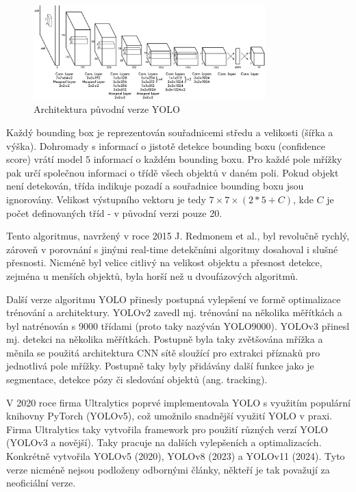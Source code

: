 \begin{figure}[]
    \centering
    \includegraphics[width=0.8\textwidth]{Figures/yolo}
    \caption{Architektura původní verze YOLO \cite{yolo}}
    \label{fig:yolo}
\end{figure}

Každý bounding box je reprezentován souřadnicemi středu a velikosti (šířka a
výška). Dohromady s informací o jistotě detekce bounding boxu (confidence
score) vrátí model $5$ informací o každém bounding boxu. Pro každé pole mřížky
pak určí společnou informaci o třídě všech objektů v daném poli. Pokud objekt
není detekován, třída indikuje pozadí a souřadnice bounding boxu jsou
ignorovány. Velikost výstupního vektoru je tedy $7 \times 7 \times (2 * 5 +
    C)$, kde $C$ je počet definovaných tříd - v původní verzi pouze 20.

Tento algoritmus, navržený v roce 2015 J. Redmonem et al., byl revolučně
rychlý, zároveň v porovnání s jinými real-time detekčními algoritmy dosahoval i
slušné přesnosti. Nicméně byl velice citlivý na velikost objektu a přesnost
detekce, zejména u menších objektů, byla horší než u dvoufázových algoritmů.

Další verze algoritmu YOLO přinesly postupná vylepšení ve formě optimalizace
trénování a architektury. YOLOv2 \cite{yolo9000} zavedl mj. trénování na
několika měřítkách a byl natrénován s 9000 třídami (proto taky nazýván
YOLO9000). YOLOv3 \cite{yolov3} přinesl mj. detekci na několika měřítkách.
Postupně byla taky zvětšována mřížka a měnila se použitá architektura CNN sítě
sloužící pro extrakci příznaků pro jednotlivá pole mřížky. Postupně taky byly
přidávány další funkce jako je segmentace, detekce pózy či sledování objektů
(ang. tracking).

V 2020 roce firma Ultralytics poprvé implementovala YOLO s využitím populární
knihovny PyTorch (YOLOv5), což umožnilo snadnější využití YOLO v praxi. Firma
Ultralytics taky vytvořila framework pro použití různých verzí YOLO (YOLOv3 a
novější). Taky pracuje na dalších vylepšeních a optimalizacích. Konkrétně
vytvořila YOLOv5 (2020), YOLOv8 (2023) a YOLOv11 (2024). Tyto verze nicméně
nejsou podloženy odbornými články, někteří je tak považují za neoficiální
verze.

